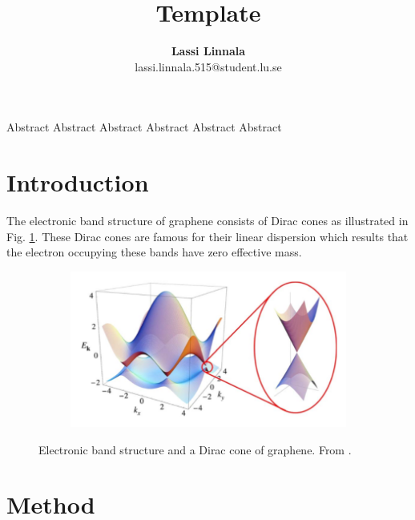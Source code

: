 \documentclass[12pt,a4paper,twoside]{article}
\numberwithin{equation}{section}
\renewcommand{\_}{\textscale{.7}{\textunderscore}}
\begin{document}
\title{Template}


\author{\textbf{Lassi Linnala} \\ lassi.linnala.515@student.lu.se}


\maketitle



\vspace{1cm}

{Abstract Abstract Abstract Abstract Abstract Abstract}

\thispagestyle{empty}
\newpage
{}

\newpage 
\tableofcontents
\clearpage
{}
\setcounter{page}{1}


\section{Introduction} 
The electronic band structure of graphene consists of Dirac cones as illustrated in Fig. \ref{dirac-cone-gr}. These Dirac cones are famous for their linear dispersion which results that the electron occupying these bands have zero effective mass.
\begin{figure}[H]
	\centering
	\begin{subfigure}{0.6\linewidth}
		\includegraphics[width=1.0\linewidth]{Gr-dirac-cone.png}
	\end{subfigure}
	\caption{Electronic band structure and a Dirac cone of graphene. From {\cite{Castro-Neto}}.}
	\label{dirac-cone-gr}
\end{figure} 

\section{Method}
\end{document}
